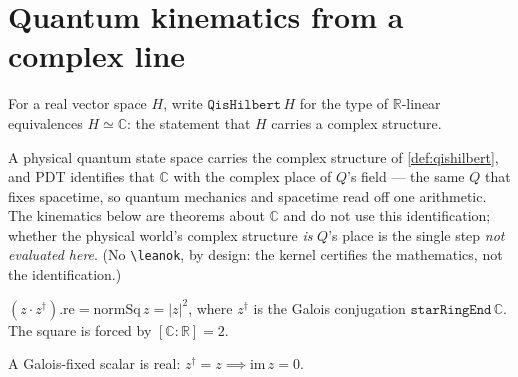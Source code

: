 
\chapter{Quantum kinematics from a complex line}

\begin{definition}
  \label{def:qishilbert}
  \leanok
  For a real vector space $H$, write $\mathtt{QisHilbert}\,H$ for the type of
  $\mathbb{R}$-linear equivalences $H \simeq \mathbb{C}$: the statement that $H$ carries a
  complex structure.
\end{definition}

\begin{assumption}
  \label{ass:posit}
  A physical quantum state space carries the complex structure of \cref{def:qishilbert}, and
  PDT identifies that $\mathbb{C}$ with the complex place of $Q$'s field --- the same $Q$ that
  fixes spacetime, so quantum mechanics and spacetime read off one arithmetic. The
  kinematics below are theorems about $\mathbb{C}$ and do not use this identification; whether the physical world's
  complex structure \emph{is} $Q$'s place is the single step \emph{not evaluated here}. (No
  \texttt{\textbackslash leanok}, by design: the kernel certifies the mathematics, not the
  identification.)
\end{assumption}

\begin{lemma}
  \label{lem:born_form}
  \leanok
  $(z\cdot z^{\dagger}).\mathrm{re} = \mathrm{normSq}\,z = |z|^2$, where $z^{\dagger}$ is the
  Galois conjugation $\mathtt{starRingEnd}\,\mathbb{C}$. The square is forced by
  $[\mathbb{C}:\mathbb{R}] = 2$.
\end{lemma}

\begin{lemma}[Hermitian = Galois-fixed = real (the pointer basis)]
  \label{lem:hermitian}
  \leanok
  A Galois-fixed scalar is real: $z^{\dagger} = z \implies \mathrm{im}\,z = 0$.
\end{lemma}

